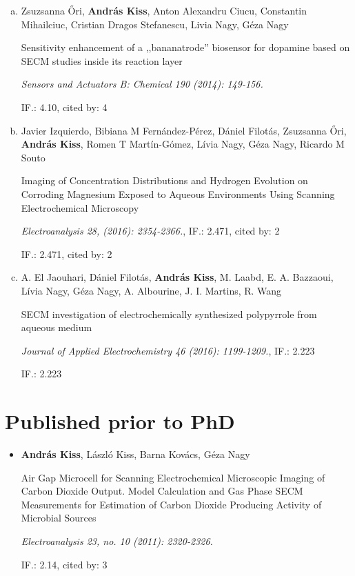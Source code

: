 \begin{enumerate}[(a)]
\item Zsuzsanna \H{O}ri, \textbf{András Kiss}, Anton Alexandru Ciucu, Constantin Mihailciuc, Cristian Dragos Stefanescu, Livia Nagy, Géza Nagy

Sensitivity enhancement of a ,,bananatrode'' biosensor for dopamine based on SECM studies inside its reaction layer

\emph{Sensors and Actuators B: Chemical 190 (2014): 149-156.}

IF.: 4.10, cited by: 4

\item Javier Izquierdo, Bibiana M Fernández-Pérez, Dániel Filotás, Zsuzsanna Őri, \textbf{András Kiss}, Romen T Martín-Gómez, Lívia Nagy, Géza Nagy, Ricardo M Souto

Imaging of Concentration Distributions and Hydrogen Evolution on Corroding Magnesium Exposed to Aqueous Environments Using Scanning Electrochemical Microscopy

\emph{Electroanalysis 28, (2016): 2354-2366.}, IF.: 2.471, cited by: 2

IF.: 2.471, cited by: 2

\item A. El Jaouhari,  Dániel Filotás, \textbf{András Kiss}, M. Laabd, E. A. Bazzaoui, Lívia Nagy, Géza Nagy, A. Albourine, J. I. Martins, R. Wang

SECM investigation of electrochemically synthesized polypyrrole from aqueous medium

\emph{Journal of Applied Electrochemistry 46 (2016): 1199-1209.}, IF.: 2.223

IF.: 2.223
\end{enumerate}

\section*{Published prior to PhD}
\begin{itemize}
\item[] \textbf{András Kiss}, László Kiss, Barna Kovács, Géza Nagy

Air Gap Microcell for Scanning Electrochemical Microscopic Imaging of Carbon Dioxide Output. Model Calculation and Gas Phase SECM Measurements for Estimation of Carbon Dioxide Producing Activity of Microbial Sources

\emph{Electroanalysis 23, no. 10 (2011): 2320-2326.}

IF.: 2.14, cited by: 3

\end{itemize}

